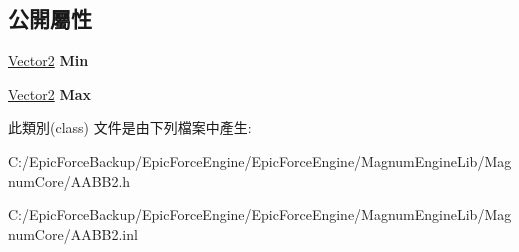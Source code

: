 \subsection*{公開屬性}
\begin{DoxyCompactItemize}
\item 
\hyperlink{class_magnum_1_1_vector2}{Vector2} {\bfseries Min}\hypertarget{class_magnum_1_1_a_a_b_b2_a4b9d4e715a5103bf498a31c95c4ff4ab}{}\label{class_magnum_1_1_a_a_b_b2_a4b9d4e715a5103bf498a31c95c4ff4ab}

\item 
\hyperlink{class_magnum_1_1_vector2}{Vector2} {\bfseries Max}\hypertarget{class_magnum_1_1_a_a_b_b2_add63041c6f4bfd31d7ad27eec7048361}{}\label{class_magnum_1_1_a_a_b_b2_add63041c6f4bfd31d7ad27eec7048361}

\end{DoxyCompactItemize}


此類別(class) 文件是由下列檔案中產生\+:\begin{DoxyCompactItemize}
\item 
C\+:/\+Epic\+Force\+Backup/\+Epic\+Force\+Engine/\+Epic\+Force\+Engine/\+Magnum\+Engine\+Lib/\+Magnum\+Core/A\+A\+B\+B2.\+h\item 
C\+:/\+Epic\+Force\+Backup/\+Epic\+Force\+Engine/\+Epic\+Force\+Engine/\+Magnum\+Engine\+Lib/\+Magnum\+Core/A\+A\+B\+B2.\+inl\end{DoxyCompactItemize}
